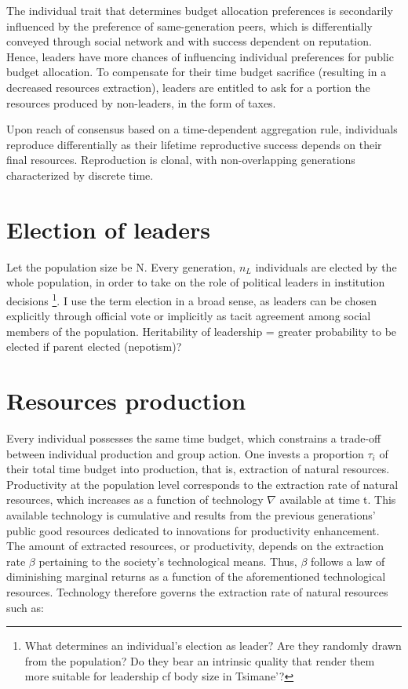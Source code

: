 \documentclass[a4paper]{article}
\begin{document}
The individual trait that determines budget allocation preferences is secondarily influenced by the preference of same-generation peers, which is differentially conveyed through social network and with success dependent on reputation. Hence, leaders have more chances of influencing individual preferences for public budget allocation. To compensate for their time budget sacrifice (resulting in a decreased resources extraction), leaders are entitled to ask for a portion the resources produced by non-leaders, in the form of taxes.

Upon reach of consensus based on a time-dependent aggregation rule, individuals reproduce differentially as their lifetime reproductive success depends on their final resources. Reproduction is clonal, with non-overlapping generations characterized by discrete time.     

\section{Election of leaders}
\label{sec:elec}

Let the population size be N. Every generation, $n_L$ individuals are elected by the whole population, in order to take on the role of political leaders in institution decisions \footnote{What determines an individual's election as leader? Are they randomly drawn from the population? Do they bear an intrinsic quality that render them more suitable for leadership cf body size in Tsimane'?}. I use the term election in a broad sense, as leaders can be chosen explicitly through official vote or implicitly as tacit agreement among social members of the population. 
Heritability of leadership = greater probability to be elected if parent elected (nepotism)?

\section{Resources production}
\label{sec:prod}

Every individual possesses the same time budget, which constrains a trade-off between individual production and group action. One invests a proportion $\tau_i$ of their total time budget into production, that is, extraction of natural resources. Productivity at the population level corresponds to the extraction rate of natural resources, which increases as a function of technology $\nabla$ available at time t. This available technology is cumulative and results from the previous generations' public good resources dedicated to innovations for productivity enhancement. The amount of extracted resources, or productivity, depends on the extraction rate $\beta$ pertaining to the society's technological means. Thus, $\beta$ follows a law of diminishing marginal returns as a function of the aforementioned technological resources. Technology therefore governs the extraction rate of natural resources such as:
\end{document}
